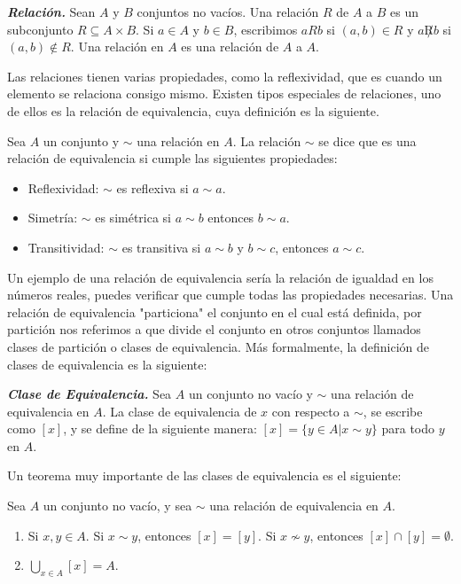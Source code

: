 \documentclass{report}
\begin{document}
\begin{defBox}
    \textit{\textbf{Relación.}} Sean $A$ y $B$ conjuntos no vacíos. Una relación $R$ de $A$ a $B$ es un subconjunto $R\subseteq A\times B$. Si $a \in A$ y $b \in B$, escribimos $a R b$ si $(a,b) \in R$ y $a \not R b$ si $(a

,b) \not \in R$. Una relación en $A$ es una relación de $A$ a $A$.
\end{defBox}

Las relaciones tienen varias propiedades, como la reflexividad, que es cuando un elemento se relaciona consigo mismo. Existen tipos especiales de relaciones, uno de ellos es la relación de equivalencia, cuya definición es la siguiente.

Sea $A$ un conjunto y $\sim$ una relación en $A$. La relación $\sim$ se dice que es una relación de equivalencia si cumple las siguientes propiedades:

\begin{itemize}
    \item Reflexividad: $\sim$ es reflexiva si $a \sim a$.
    \item Simetría: $\sim$ es simétrica si $a \sim b$ entonces $b \sim a$.
    \item Transitividad: $\sim$ es transitiva si $a \sim b$ y $b \sim c$, entonces $a \sim c$.
\end{itemize}

Un ejemplo de una relación de equivalencia sería la relación de igualdad en los números reales, puedes verificar que cumple todas las propiedades necesarias. Una relación de equivalencia "particiona" el conjunto en el cual está definida, por partición nos referimos a que divide el conjunto en otros conjuntos llamados clases de partición o clases de equivalencia. Más formalmente, la definición de clases de equivalencia es la siguiente:

\begin{defBox}
    \textit{\textbf{Clase de Equivalencia.}} Sea $A$ un conjunto no vacío y $\sim$ una relación de equivalencia en $A$. La clase de equivalencia de $x$ con respecto a $\sim$, se escribe como $[x]$, y se define de la siguiente manera: $[x] = \{y \in A | x \sim y\}$ para todo $y$ en $A$.
\end{defBox}

Un teorema muy importante de las clases de equivalencia es el siguiente:

\begin{thBox}
    Sea $A$ un conjunto no vacío, y sea $\sim$ una relación de equivalencia en $A$.

    \begin{enumerate}
        \item Si $x, y \in A$. Si $x\sim y$, entonces $[x] = [y]$. Si $x \not \sim y$, entonces $[x] \cap [y] = \emptyset$.
        \item $\bigcup_{x\in A}[x] = A$.
    \end{enumerate}
\end{thBox}
\end{document}
